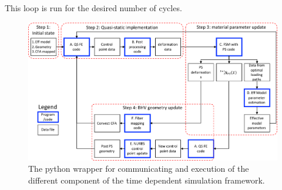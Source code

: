     This loop is run for the desired number of cycles. 
\begin{figure}
\centering
\includegraphics[width=8.2in]{Images/chapter6/pythonimplementation.pdf}
\caption{The python wrapper for communicating and execution of the different component of the time dependent simulation framework.}
\label{c6:fig:pythonimplementation}
\end{figure}
